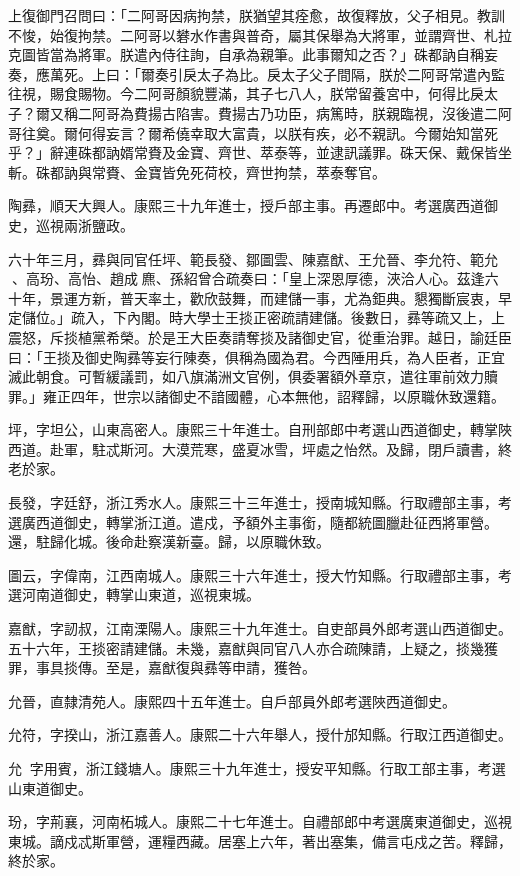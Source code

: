\begin{pinyinscope}
上復御門召問曰：「二阿哥因病拘禁，朕猶望其痊愈，故復釋放，父子相見。教訓不悛，始復拘禁。二阿哥以礬水作書與普奇，屬其保舉為大將軍，並謂齊世、札拉克圖皆當為將軍。朕遣內侍往詢，自承為親筆。此事爾知之否？」硃都訥自稱妄奏，應萬死。上曰：「爾奏引戾太子為比。戾太子父子間隔，朕於二阿哥常遣內監往視，賜食賜物。今二阿哥顏貌豐滿，其子七八人，朕常留養宮中，何得比戾太子？爾又稱二阿哥為費揚古陷害。費揚古乃功臣，病篤時，朕親臨視，沒後遣二阿哥往奠。爾何得妄言？爾希僥幸取大富貴，以朕有疾，必不親訊。今爾始知當死乎？」辭連硃都訥婿常賚及金寶、齊世、萃泰等，並逮訊議罪。硃天保、戴保皆坐斬。硃都訥與常賚、金寶皆免死荷校，齊世拘禁，萃泰奪官。

陶彞，順天大興人。康熙三十九年進士，授戶部主事。再遷郎中。考選廣西道御史，巡視兩浙鹽政。

六十年三月，彞與同官任坪、範長發、鄒圖雲、陳嘉猷、王允晉、李允符、範允、高玢、高怡、趙成麃、孫紹曾合疏奏曰：「皇上深恩厚德，浹洽人心。茲逢六十年，景運方新，普天率土，歡欣鼓舞，而建儲一事，尤為鉅典。懇獨斷宸衷，早定儲位。」疏入，下內閣。時大學士王掞正密疏請建儲。後數日，彞等疏又上，上震怒，斥掞植黨希榮。於是王大臣奏請奪掞及諸御史官，從重治罪。越日，諭廷臣曰：「王掞及御史陶彞等妄行陳奏，俱稱為國為君。今西陲用兵，為人臣者，正宜滅此朝食。可暫緩議罰，如八旗滿洲文官例，俱委署額外章京，遣往軍前效力贖罪。」雍正四年，世宗以諸御史不諳國體，心本無他，詔釋歸，以原職休致還籍。

坪，字坦公，山東高密人。康熙三十年進士。自刑部郎中考選山西道御史，轉掌陜西道。赴軍，駐忒斯河。大漠荒寒，盛夏冰雪，坪處之怡然。及歸，閉戶讀書，終老於家。

長發，字廷舒，浙江秀水人。康熙三十三年進士，授南城知縣。行取禮部主事，考選廣西道御史，轉掌浙江道。遣戍，予額外主事銜，隨都統圖臘赴征西將軍營。還，駐歸化城。後命赴察漢新臺。歸，以原職休致。

圖云，字偉南，江西南城人。康熙三十六年進士，授大竹知縣。行取禮部主事，考選河南道御史，轉掌山東道，巡視東城。

嘉猷，字訒叔，江南溧陽人。康熙三十九年進士。自吏部員外郎考選山西道御史。五十六年，王掞密請建儲。未幾，嘉猷與同官八人亦合疏陳請，上疑之，掞幾獲罪，事具掞傳。至是，嘉猷復與彞等申請，獲咎。

允晉，直隸清苑人。康熙四十五年進士。自戶部員外郎考選陜西道御史。

允符，字揆山，浙江嘉善人。康熙二十六年舉人，授什邡知縣。行取江西道御史。

允，字用賓，浙江錢塘人。康熙三十九年進士，授安平知縣。行取工部主事，考選山東道御史。

玢，字荊襄，河南柘城人。康熙二十七年進士。自禮部郎中考選廣東道御史，巡視東城。謫戍忒斯軍營，運糧西藏。居塞上六年，著出塞集，備言屯戍之苦。釋歸，終於家。


\end{pinyinscope}

